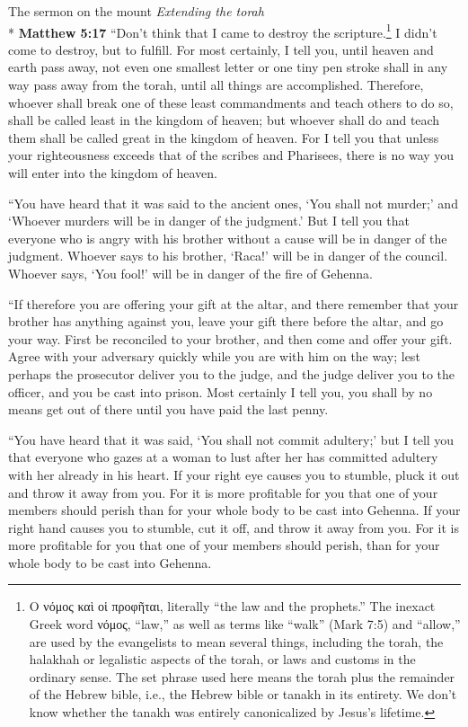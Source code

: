 \documentclass[10pt,twoside]{article} %
\newcommand{\quotesize}{\normalsize{}}
\newenvironment{quotetext}{\begingroup\quotesize}{\endgroup}
\newcommand{\intex}[1]{\index[texts]{#1}}
\newcommand{\bible}[2]{\begin{quotetext}\textbf{#1}\intex{#1} #2\end{quotetext}}
\newcommand{\matthew}[2]{\bible{Matthew #1}{#2}}
\newcommand{\subhead}[1]{\emph{#1}\\*}
\begin{document}
\begin{section}{The sermon on the mount}
\subhead{Extending the torah}
\matthew{5:17}{
``Don't think that I came to destroy the scripture.\footnote{Ο νόμος καὶ οἱ προφῆται, literally ``the law and the prophets.''
The inexact Greek word νόμος, ``law,'' as well as terms like ``walk'' (Mark 7:5) and ``allow,'' are used by the evangelists
to mean several things, including the torah, the halakhah or legalistic aspects of the torah, or laws and customs in the ordinary
sense. The set phrase used here means the torah plus the remainder
of the Hebrew bible, i.e., the Hebrew bible or tanakh in its entirety. We don't know whether the tanakh was
entirely canonicalized by Jesus's lifetime.} I didn't come to destroy, but to fulfill.    For most certainly, I tell you, until heaven and earth pass away, not even one smallest letter or one tiny pen stroke shall in any way pass away from the torah, until all things are accomplished.    Therefore, whoever shall break one of these least commandments and teach others to do so, shall be called least in the kingdom of heaven; but whoever shall do and teach them shall be called great in the kingdom of heaven.    For I tell you that unless your righteousness exceeds that of the scribes and Pharisees, there is no way you will enter into the kingdom of heaven.

   ``You have heard that it was said to the ancient ones, `You shall not murder;' and `Whoever murders will be in danger of the judgment.'    But I tell you that everyone who is angry with his brother without a cause  will be in danger of the judgment. Whoever says to his brother, `Raca!' will be in danger of the council. Whoever says, `You fool!' will be in danger of the fire of Gehenna.

   ``If therefore you are offering your gift at the altar, and there remember that your brother has anything against you,    leave your gift there before the altar, and go your way. First be reconciled to your brother, and then come and offer your gift.    Agree with your adversary quickly while you are with him on the way; lest perhaps the prosecutor deliver you to the judge, and the judge deliver you to the officer, and you be cast into prison.    Most certainly I tell you, you shall by no means get out of there until you have paid the last penny.

   ``You have heard that it was said,  `You shall not commit adultery;'    but I tell you that everyone who gazes at a woman to lust after her has committed adultery with her already in his heart.    If your right eye causes you to stumble, pluck it out and throw it away from you. For it is more profitable for you that one of your members should perish than for your whole body to be cast into Gehenna.    If your right hand causes you to stumble, cut it off, and throw it away from you. For it is more profitable for you that one of your members should perish, than for your whole body to be cast into Gehenna.

}
\end{section}
\end{document}
